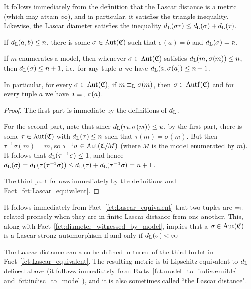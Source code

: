 	\begin{rem}
		It follows immediately from the definition that the Lascar distance is a metric (which may attain $\infty$), and in particular, it satisfies the triangle inequality.
		Likewise, the Lascar diameter satisfies the inequality $d_{\mathrm{L}}(\sigma\tau)\leq d_{\mathrm{L}}(\sigma)+d_{\mathrm{L}}(\tau)$. \xqed{\lozenge}
	\end{rem}
	
	\begin{fct}
		\label{fct:diameter_witnessed_by_model}
		If $d_{\mathrm{L}}(a,b)\leq n$, there is some $\sigma\in \operatorname{{Aut}}({\mathfrak C})$ such that $\sigma(a)=b$ and $d_{\mathrm{L}}(\sigma)=n$.
		
		If $m$ enumerates a model, then whenever $\sigma\in \operatorname{{Aut}}({\mathfrak C})$ satisfies $d_{\mathrm{L}}(m,\sigma(m))\leq n$, then $d_{\mathrm{L}}(\sigma)\leq n+1$, i.e.\ for any tuple $a$ we have $d_{\mathrm{L}}(a,\sigma(a))\leq n+1$.
		
		In particular, for every $\sigma\in\operatorname{{Aut}}({\mathfrak C})$, if $m\equiv_{\mathrm{L}}\sigma(m)$, then $\sigma\in \Autf(\fC)$ and for every tuple $a$ we have $a\equiv_{\mathrm{L}}\sigma(a)$.
	\end{fct}
	\begin{proof}
		The first part is immediate by the definitions of $d_{\mathrm{L}}$.
		
		For the second part, note that since $d_{\mathrm{L}}(m,\sigma(m))\leq n$, by the first part, there is some $\tau\in \operatorname{{Aut}}({\mathfrak C})$ with $d_{\mathrm{L}}(\tau)\leq n$ such that $\tau(m)=\sigma(m)$. But then $\tau^{-1}\sigma(m)=m$, so $\tau^{-1}\sigma\in\operatorname{{Aut}}({\mathfrak C}/M)$ (where $M$ is the model enumerated by $m$). It follows that $d_{\mathrm{L}}(\tau^{-1}\sigma)\leq 1$, and hence $d_{\mathrm{L}}(\sigma)=d_{\mathrm{L}}(\tau(\tau^{-1}\sigma))\leq d_{\mathrm{L}}(\tau)+d_{\mathrm{L}}(\tau^{-1}\sigma)=n+1$.
		
		The third part follows immediately by the definitions and Fact~\ref{fct:Lascar_equivalent}.
	\end{proof}
	
	
	\begin{rem}
		It follows immediately from Fact~\ref{fct:Lascar_equivalent} that two tuples are $\equiv_{\mathrm{L}}$-related precisely when they are in finite Lascar distance from one another. This, along with Fact~\ref{fct:diameter_witnessed_by_model}, implies that a $\sigma\in \operatorname{{Aut}}({\mathfrak C})$ is a Lascar strong automorphism if and only if $d_{\mathrm{L}}(\sigma)<\infty$.\xqed{\lozenge}
	\end{rem}
	
	\begin{rem}
		The Lascar distance can also be defined in terms of the third bullet in Fact~\ref{fct:Lascar_equivalent}. The resulting metric is bi-Lipschitz equivalent to $d_{\mathrm{L}}$ defined above (it follows immediately from Facts~\ref{fct:model_to_indiscernible} and \ref{fct:indisc_to_model}), and it is also sometimes called ``the Lascar distance".\xqed{\lozenge}
	\end{rem}
	
